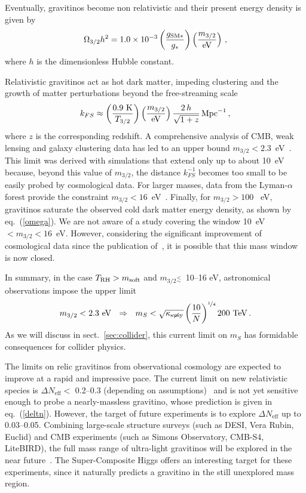 \documentclass[a4paper,12pt]{article}
\newcommand{\tev}{\textrm{TeV}}
\newcommand{\lsim}{\stackrel{<}{_\sim}}
\newcommand{\beq}{\begin{equation}}
\newcommand{\eeq}{\end{equation}}
\def\eq#1{eq.~(\ref{#1})}
\def\eq#1{eq.~(\ref{#1})}
\def\sec#1{sect.~\ref{#1}}
\def\mS{m_S}
\def\Ks{\kappa_ {{\rm susy}\! \! \! \! \! \! \! \!\diagup \,\,\,}}
\def\msoft{m_{\rm soft}}
\def\mgra{m_{3/2}}
\def\TR{T_{\textrm{RH}}}
\def\gSM{g_{\textrm{SM}*}}
\begin{document}
{{{{Eventually, gravitinos become non relativistic and their present energy density is given by
 \beq
 \Omega_{3/2} h^2 = 1.0 \times 10^{-3} \left( \frac{\gSM}{g_*} \right) \left( \frac{\mgra}{\rm eV} \right)\, ,
 \label{omega}
 \eeq
 where $h$ is the dimensionless Hubble constant.
 
Relativistic gravitinos act as hot dark matter, impeding clustering and the growth of matter perturbations beyond the free-streaming scale
\beq
k_{FS} \approx  \left( \frac{0.9~{\rm K}}{T_{3/2}}\right) \left( \frac{\mgra}{\rm eV}\right)  \frac{ 2\, h}{\sqrt{1+z}}\, {\rm Mpc}^{-1}\, ,
\eeq
where $z$ is the corresponding redshift. A comprehensive analysis of CMB, weak lensing and galaxy clustering data has led to an upper bound $\mgra < 2.3$~eV~\cite{Xu:2021rwg}. This limit was derived with simulations that extend only up to about 10~eV because, beyond this value of $\mgra$, the distance $k^{-1}_{FS}$ becomes too small to be easily probed by cosmological data. For larger masses, data from the Lyman-$\alpha$ forest provide the constraint $\mgra < 16$~eV~\cite{Viel:2005qj}. Finally, for $\mgra > 100$~ eV, gravitinos saturate the observed cold dark matter energy density, as shown by \eq{omega}. We are not aware of a study covering the window 10~eV$<\mgra < 16$~eV. However, considering the significant improvement of cosmological data since the publication of~\cite{Viel:2005qj}, it is possible that this mass window is now closed.

In summary, in the case  $\TR > \msoft$ and $\mgra \lsim $~10--16 eV, astronomical observations impose the upper limit
\beq
\mgra < 2.3~{\rm eV} ~~\Rightarrow~~ \mS<\sqrt{\Ks}\left( \frac{10}{N}\right)^{\nicefrac{1}{4}}
200~\tev \, .
\label{limk1}
\eeq
As we will discuss in \sec{sec:collider}, this current limit on $\mS$
has formidable consequences for collider physics.

The limits on relic gravitinos from observational cosmology are expected to improve at a rapid and impressive pace. The current limit on new relativistic species is $\Delta N_{\textrm{eff}}  <$ 0.2--0.3 (depending on assumptions)~\cite{ParticleDataGroup:2024cfk} and is not yet sensitive enough to probe a nearly-massless gravitino, whose prediction is given in \eq{deltn}. However, the target of future experiments is to explore $\Delta N_{\textrm{eff}}$ up to 0.03--0.05.
Combining large-scale structure surveys (such as DESI, Vera Rubin, Euclid) and CMB experiments (such as Simons Observatory, CMB-S4, LiteBIRD), the full mass range of ultra-light gravitinos will be explored in the near future~\cite{Xu:2021rwg}. The Super-Composite Higgs offers an interesting target for these experiments, since it naturally predicts a gravitino in the still unexplored mass region.



}}}}
\end{document}
